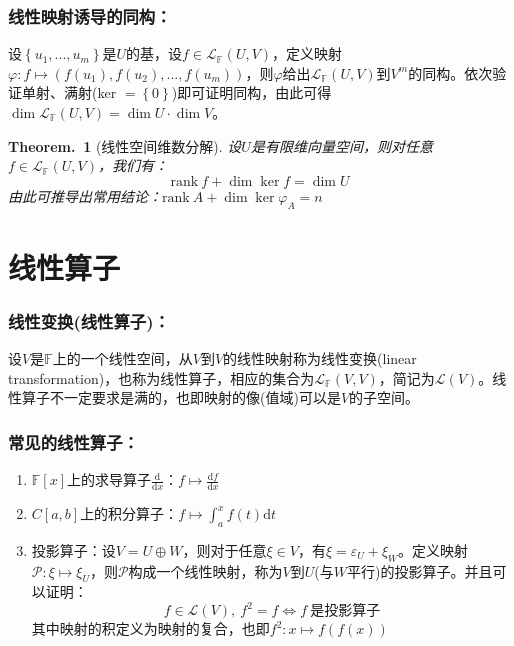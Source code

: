 \documentclass[zihao=-4,UTF8]{report}
\theoremstyle{mystyle} %
\newtheorem{theorem}{Theorem.\,}
\begin{document}
\subsubsection{线性映射诱导的同构：}
设$\left\{u_1,...,u_m\right\}$是$U$的基，设$f \in \mathscr{L}_{\mathbb{F}}(U,V)$，定义映射$\varphi : f \longmapsto \left( f(u_1),f(u_2),...,f(u_m)\right)$，则$\varphi$给出$\mathscr{L}_{\mathbb{F}}(U,V)$到$V^m$的同构。{\color{gray}\small 依次验证单射、满射(ker $ = \left\{0\right\}$)即可证明同构，由此可得$\dim \mathscr{L}_{\mathbb{F}}(U,V) = \dim U \cdot \dim V$。}
\begin{theorem}[线性空间维数分解]
    设$U$是有限维向量空间，则对任意$f \in \mathscr{L}_{\mathbb{F}}(U,V)$，我们有：
    \begin{equation*}
        \text{rank}\   f + \dim \ker f = \dim U
    \end{equation*}
    {\color{gray}\small 由此可推导出常用结论：$\text{rank}\  A + \dim \ker \varphi_A = n$}
\end{theorem}

\section{线性算子}
\subsubsection{线性变换(线性算子)：}
设$V$是$\mathbb{F}$上的一个线性空间，从$V$到$V$的线性映射称为线性变换(linear transformation)，也称为线性算子，相应的集合为$\mathscr{L}_{\mathbb{F}}(V,V)$，简记为$\mathscr{L}(V)$。{\color{gray}\small 线性算子不一定要求是满的，也即映射的像(值域)可以是$V$的子空间。}


\subsubsection{常见的线性算子：}
\begin{enumerate}
    \item $\mathbb{F}[x]$上的求导算子$\frac{\mathrm{d}}{\mathrm{d}x}$：$f \longmapsto \frac{\mathrm{d}f}{\mathrm{d}x}$
    \item $C[a,b]$上的积分算子：$f \longmapsto \int_{a}^{x}f(t)\mathrm{d}t$
    \item 投影算子：设$V = U \oplus W$，则对于任意$\xi  \in V$，有$\xi  = \varepsilon_U + \xi _W$。定义映射$\mathscr{P}: \xi  \longmapsto \xi_U$，则$\mathscr{P}$构成一个线性映射，称为$V$到$U$(与$W$平行)的投影算子。并且可以证明：
    \begin{equation*}
        f \in \mathscr{L}(V),\ f^2 = f \Longleftrightarrow f\ \text{是投影算子}
    \end{equation*}
    其中映射的积定义为映射的复合，也即$f^2:x \longmapsto f(f(x))$
\end{enumerate}
\end{document}
